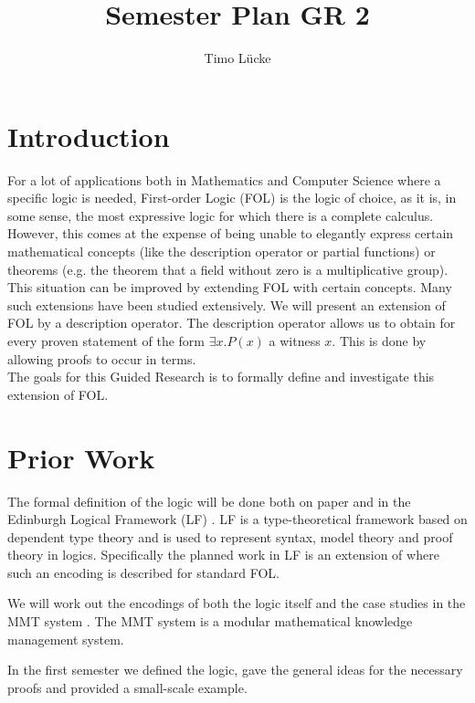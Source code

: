 \documentclass[a4paper,10pt]{article}
\title{Semester Plan GR 2}
\author{Timo Lücke}
\begin{document}
\maketitle

\section{Introduction}
For a lot of applications both in Mathematics and Computer Science where a specific 
logic is needed, First-order Logic (FOL) is the logic of choice, as it is, in some sense,
the most expressive logic for which there is a complete calculus.
However, this comes at the expense of being unable to elegantly express certain mathematical 
concepts (like the description operator or partial functions) or theorems (e.g. the theorem that a field without zero
is a multiplicative group). \\
This situation can be improved by extending FOL with certain concepts. 
Many such extensions have been studied extensively. We will present an extension of FOL by a description operator.
The description operator allows us to obtain for every proven statement of the form $\exists x . P(x)$ a witness $x$. This is done by allowing proofs to occur in terms.\\
The goals for this Guided Research is to formally define and investigate this extension of FOL. 


\section{Prior Work}
The formal definition of the logic will be done both on paper and in the Edinburgh Logical Framework (LF) \cite{HHP93}.
LF is a type-theoretical framework based on dependent type theory and is used to represent syntax, model theory and proof theory in logics.
Specifically the planned work in LF is an extension of \cite{HR11} where such an encoding is described for standard FOL.

We will work out the encodings of both the logic itself and the case studies in the MMT system \cite{RK13}. The MMT system is a modular mathematical knowledge management system.

In the first semester we defined the logic, gave the general ideas for the necessary proofs and provided a small-scale example.
\end{document}
